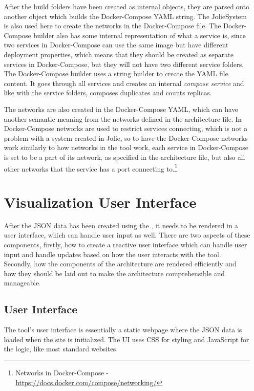 After the build folders have been created as internal objects, they are parsed onto another object which builds the Docker-Compose YAML string. The JolieSystem is also used here to create the networks in the Docker-Compose file.
The Docker-Compose builder also has some internal representation of what a service is, since two services in Docker-Compose can use the same image but have different deployment properties, which means that they should be created as separate services in Docker-Compose, but they will not have two different service folders.
The Docker-Compose builder uses a string builder to create the YAML file content. It goes through all services and creates an internal \emph{compose service} and like with the service folders, composes duplicates and counts replicas.

The networks are also created in the Docker-Compose YAML, which can have another semantic meaning from the networks defined in the architecture file.
In Docker-Compose networks are used to restrict services connecting, which is not a problem with a system created in Jolie, so to have the Docker-Compose networks work similarly to how networks in the tool work, each service in Docker-Compose is set to be a part of
its network, as specified in the architecture file, but also all other networks that the service has a port connecting to.\footnote{Networks in Docker-Compose - \url{https://docs.docker.com/compose/networking/}}

\section{Visualization User Interface}
After the JSON data has been created using the \javatoolname[], it needs to be rendered in a user interface, which can handle user input as well.
There are two aspects of these components, firstly, how to create a reactive user interface which can handle user input and handle updates based on how the user interacts with the tool. Secondly, how the components of the architecture are rendered efficiently and how they should be laid out to make the architecture comprehensible and manageable.

\subsection{User Interface}
The tool's user interface is essentially a static webpage where the JSON data is loaded when the site is initialized.
The UI uses CSS for styling and JavaScript for the logic, like most standard websites.

